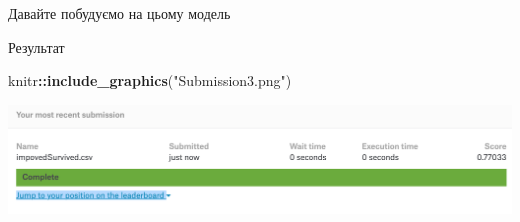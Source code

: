 \documentclass[ignorenonframetext,]{beamer}
\newenvironment{Shaded}{\begin{snugshade}}{\end{snugshade}}
\newcommand{\DataTypeTok}[1]{\textcolor[rgb]{0.13,0.29,0.53}{#1}}
\newcommand{\DecValTok}[1]{\textcolor[rgb]{0.00,0.00,0.81}{#1}}
\newcommand{\KeywordTok}[1]{\textcolor[rgb]{0.13,0.29,0.53}{\textbf{#1}}}
\newcommand{\NormalTok}[1]{#1}
\newcommand{\OperatorTok}[1]{\textcolor[rgb]{0.81,0.36,0.00}{\textbf{#1}}}
\newcommand{\OtherTok}[1]{\textcolor[rgb]{0.56,0.35,0.01}{#1}}
\newcommand{\StringTok}[1]{\textcolor[rgb]{0.31,0.60,0.02}{#1}}
\begin{document}
\begin{frame}[fragile]{Давайте побудуємо на цьому модель}
\protect\hypertarget{ux434ux430ux432ux430ux439ux442ux435-ux43fux43eux431ux443ux434ux443ux454ux43cux43e-ux43dux430-ux446ux44cux43eux43cux443-ux43cux43eux434ux435ux43bux44c}{}

\begin{Shaded}
\end{Shaded}

\end{frame}

\begin{frame}[fragile]{Результат}
\protect\hypertarget{ux440ux435ux437ux443ux43bux44cux442ux430ux442}{}

\begin{Shaded}
\begin{Highlighting}[]
\NormalTok{knitr}\OperatorTok{::}\KeywordTok{include_graphics}\NormalTok{(}\StringTok{"Submission3.png"}\NormalTok{)}
\end{Highlighting}
\end{Shaded}

\includegraphics[width=25.69in]{Submission3}

\end{frame}
\end{document}
